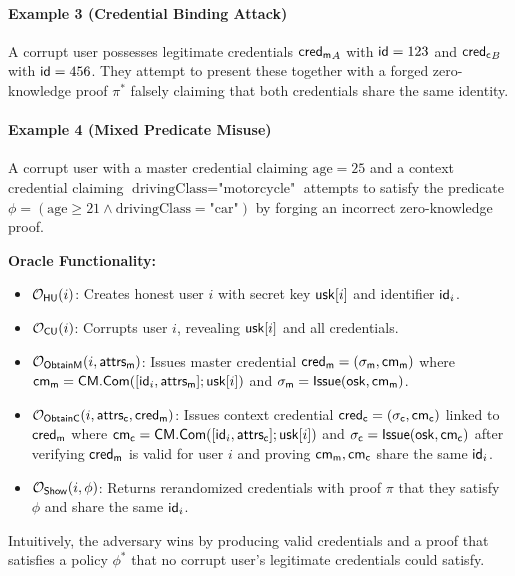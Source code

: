 \paragraph{Example 3 (Credential Binding Attack)} A corrupt user possesses legitimate credentials $\mathsf{cred_m}_A$ with $\mathsf{id}=123$ and $\mathsf{cred_c}_B$ with $\mathsf{id}=456$. They attempt to present these together with a forged zero-knowledge proof $\pi^*$ falsely claiming that both credentials share the same identity.

\paragraph{Example 4 (Mixed Predicate Misuse)} A corrupt user with a master credential claiming $\text{age}=25$ and a context credential claiming $\text{drivingClass}=\text{"motorcycle"}$ attempts to satisfy the predicate $\phi=(\text{age} \geq 21 \land \text{drivingClass} = \text{"car"})$ by forging an incorrect zero-knowledge proof.

\noindent \textbf{Oracle Functionality:}
\begin{itemize}
    \item $\mathcal{O}_{\mathsf{HU}}(i)$: Creates honest user $i$ with secret key $\mathsf{usk}[i]$ and identifier $\mathsf{id}_i$.
    
    \item $\mathcal{O}_{\mathsf{CU}}(i)$: Corrupts user $i$, revealing $\mathsf{usk}[i]$ and all credentials.
    
    \item $\mathcal{O}_{\mathsf{ObtainM}}(i, \mathsf{attrs_m})$: Issues master credential $\mathsf{cred_m} = (\sigma_{\mathsf{m}}, \mathsf{cm_m})$ where $\mathsf{cm_m} = \mathsf{CM.Com}([\mathsf{id}_i, \mathsf{attrs_m}]; \mathsf{usk}[i])$ and $\sigma_{\mathsf{m}} = \mathsf{Issue}(\mathsf{osk}, \mathsf{cm_m})$.
    
    \item $\mathcal{O}_{\mathsf{ObtainC}}(i, \mathsf{attrs_c}, \mathsf{cred_m})$: Issues context credential $\mathsf{cred_c} = (\sigma_{\mathsf{c}}, \mathsf{cm_c})$ linked to $\mathsf{cred_m}$ where $\mathsf{cm_c} = \mathsf{CM.Com}([\mathsf{id}_i, \mathsf{attrs_c}]; \mathsf{usk}[i])$ and $\sigma_{\mathsf{c}} = \mathsf{Issue}(\mathsf{osk}, \mathsf{cm_c})$ after verifying $\mathsf{cred_m}$ is valid for user $i$ and proving $\mathsf{cm_m}, \mathsf{cm_c}$ share the same $\mathsf{id}_i$.
    
    \item $\mathcal{O}_{\mathsf{Show}}(i, \phi)$: Returns rerandomized credentials with proof $\pi$ that they satisfy $\phi$ and share the same $\mathsf{id}_i$.
\end{itemize}

\noindent Intuitively, the adversary wins by producing valid credentials and a proof that satisfies a policy $\phi^*$ that no corrupt user's legitimate credentials could satisfy.






